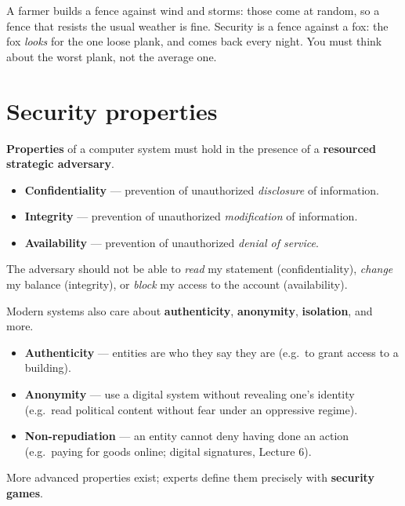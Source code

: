 \begin{goatbox}
A farmer builds a fence against wind and storms: those come at random, so a fence that resists
the usual weather is fine. Security is a fence against a fox: the fox \emph{looks} for the one
loose plank, and comes back every night. You must think about the worst plank, not the average
one.
\end{goatbox}

\section{Security properties}

\textbf{Properties} of a computer system must hold in the presence of a \textbf{resourced strategic adversary}.

\begin{defnbox}[title=CIA triad]
\begin{itemize}
  \item \textbf{Confidentiality} — prevention of unauthorized \emph{disclosure} of information.
  \item \textbf{Integrity} — prevention of unauthorized \emph{modification} of information.
  \item \textbf{Availability} — prevention of unauthorized \emph{denial of service}.
\end{itemize}
\end{defnbox}

\begin{exbox}[title=CIA on a bank account]
The adversary should not be able to \textit{read} my statement (confidentiality),
\textit{change} my balance (integrity), or \textit{block} my access to the account
(availability).
\end{exbox}

\begin{rembox}[title=Beyond the CIA triad]
Modern systems also care about \textbf{authenticity}, \textbf{anonymity},
\textbf{isolation}, and more.
\end{rembox}

\begin{defnbox}[title={Not-so-traditional (but important) properties}]
\begin{itemize}
  \item \textbf{Authenticity} --- entities are who they say they are (e.g.\ to grant access to
        a building).
  \item \textbf{Anonymity} --- use a digital system without revealing one's identity (e.g.\
        read political content without fear under an oppressive regime).
  \item \textbf{Non-repudiation} --- an entity cannot deny having done an action (e.g.\ paying
        for goods online; digital signatures, Lecture 6).
\end{itemize}
More advanced properties exist; experts define them precisely with \textbf{security games}.
\end{defnbox}

